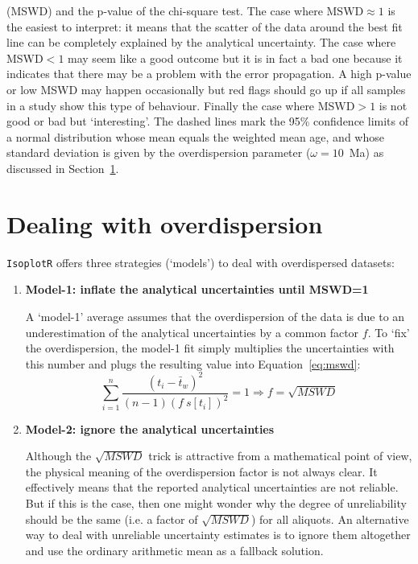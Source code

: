 \begin{refsection}
\begin{minipage}[t]{.63\textwidth}
{    (MSWD) and the p-value of the chi-square test. The case where
    $\mbox{MSWD}\approx{1}$ is the easiest to interpret: it means that
    the scatter of the data around the best fit line can be completely
    explained by the analytical uncertainty. The case where MSWD$<{1}$
    may seem like a good outcome but it is in fact a bad one because
    it indicates that there may be a problem with the error
    propagation. A high p-value or low MSWD may happen occasionally
    but red flags should go up if all samples in a study show this
    type of behaviour. Finally the case where MSWD$>{1}$ is not good
    or bad but `interesting'. The dashed lines mark the 95\%
    confidence limits of a normal distribution whose mean equals the
    weighted mean age, and whose standard deviation is given by the
    overdispersion parameter ($\omega=10$~Ma) as discussed in
    Section~\ref{sec:overdispersion}.}
  \label{fig:wtdmeanMSWD}
\end{minipage}

\section{Dealing with overdispersion}
\label{sec:overdispersion}

\texttt{IsoplotR} offers three strategies (`models') to deal with
overdispersed datasets:

\begin{enumerate}
\item\textbf{Model-1: inflate the analytical uncertainties until MSWD=1}

  A `model-1' average assumes that the overdispersion of the data is due
  to an underestimation of the analytical uncertainties by a common
  factor $f$. To `fix' the overdispersion, the model-1 fit simply
  multiplies the uncertainties with this number and plugs the resulting
  value into Equation~\ref{eq:mswd}:
  \[
  \sum\limits_{i=1}^{n}\frac{(t_i-\bar{t}_w)^2}{(n-1) (f~s[t_i])^2} = 1
  \Rightarrow f = \sqrt{MSWD}
  \]

\item\textbf{Model-2: ignore the analytical uncertainties}
  
  Although the $\sqrt{MSWD}$ trick is attractive from a mathematical
  point of view, the physical meaning of the overdispersion factor is
  not always clear. It effectively means that the reported analytical
  uncertainties are not reliable. But if this is the case, then one
  might wonder why the degree of unreliability should be the same
  (i.e. a factor of $\sqrt{MSWD}$) for all aliquots. An alternative
  way to deal with unreliable uncertainty estimates is to ignore them
  altogether and use the ordinary arithmetic mean as a fallback
  solution.
  

\end{enumerate}
\end{refsection}
